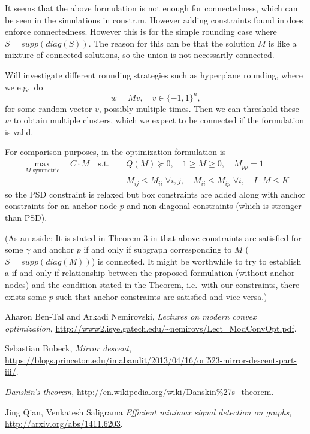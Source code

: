 \documentclass{article}
\begin{document}
It seems that the above formulation is not enough for connectedness, which can be seen in the simulations in constr.m. However adding constraints found in \cite{nips} does enforce connectedness. However this is for the simple rounding case where $S = supp(diag(S))$. The reason for this can be that the solution $M$ is like a mixture of connected solutions, so the union is not necessarily connected.

Will investigate different rounding strategies such as hyperplane rounding, where we e.g.\ do
\[ w = Mv, \quad v \in \{-1, 1\}^n, \]
for some random vector $v$, possibly multiple times. Then we can threshold these $w$ to obtain multiple clusters, which we expect to be connected if the formulation is valid.

For comparison purposes, in \cite{nips} the optimization formulation is
\begin{align*}
  \max_{M \text{ symmetric}} \quad C \cdot M \quad \mathrm{s.t.\ } \quad & Q(M) \succeq 0, \quad 1 \geq M \geq 0, \quad M_{pp} = 1 \\
  & M_{ij} \leq M_{ii} \; \forall i, j, \quad M_{ii} \leq M_{ip} \; \forall i, \quad I \cdot M \leq K
\end{align*}
so the PSD constraint is relaxed but box constraints are added along with anchor constraints for an anchor node $p$ and non-diagonal constraints (which is stronger than PSD).

(As an aside: It is stated in Theorem 3 in \cite{nips} that above constraints are satisfied for some $\gamma$ and anchor $p$ if and only if subgraph corresponding to $M$ ($S = supp(diag(M))$) is connected. It might be worthwhile to try to establish a if and only if relationship between the proposed formulation (without anchor nodes) and the condition stated in the Theorem, i.e.\ with our constraints, there exists some $p$ such that anchor constraints are satisfied and vice versa.)




\begin{thebibliography}{9}

  Aharon Ben-Tal and Arkadi Nemirovski,
  \emph{Lectures on modern convex optimization},
  \url{http://www2.isye.gatech.edu/~nemirovs/Lect_ModConvOpt.pdf}.

  Sebastian Bubeck,
  \emph{Mirror descent},
  \url{https://blogs.princeton.edu/imabandit/2013/04/16/orf523-mirror-descent-part-iii/}.

  \emph{Danskin's theorem},
  \url{http://en.wikipedia.org/wiki/Danskin\%27s_theorem}.

  Jing Qian, Venkatesh Saligrama
  \emph{Efficient minimax signal detection on graphs},
  \url{http://arxiv.org/abs/1411.6203}.

\end{thebibliography}
\end{document}
